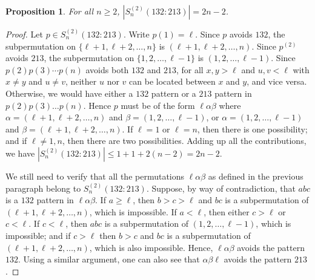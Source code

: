 \documentclass[10pt,a4paper]{amsart}
\newtheorem{proposition}[theorem]{Proposition}
\numberwithin{equation}{section}
\begin{document}
\begin{proposition}
    For all $n\geq2$, $|S_n^{(2)}(132:213)|=2n-2$.
\end{proposition}
\begin{proof}
    Let $p\in S_n^{(2)}(132:213)$. Write $p(1)=\ell$. 
Since $p$ avoids $132$, the subpermutation on $\{\ell+1,\ell+2,\ldots,n\}$ is $(\ell+1,\ell+2,\ldots,n)$. 
Since $p^{(2)}$ avoids $213$, the subpermutation on $\{1,2,\ldots,\ell-1\}$ is $(1,2,\ldots,\ell-1)$. Since $p(2)p(3)\cdots p(n)$ avoids both $132$ and $213$, for all $x,y>\ell$ and $u,v<\ell$ with $x\neq y$ and $u\neq v$, neither $u$ nor $v$ can be located between $x$ and $y$, and vice versa. Otherwise, we would have either a $132$ pattern or a $213$ pattern in $p(2)p(3)\ldots p(n)$. Hence $p$ must be of the form $\ell\alpha\beta$ where $\alpha=(\ell+1,\ell+2,\ldots,n)$ and $\beta=(1,2,\ldots,\ell-1)$, or $\alpha=(1,2,\ldots,\ell-1)$ and $\beta=(\ell+1,\ell+2,\ldots,n)$. If $\ell=1$ or $\ell=n$, then there is one possibility; and if $\ell\neq 1,n$, then there are two possibilities. Adding up all the contributions, we have $|S_n^{(2)}(132:213)|\leq 1+1+2(n-2)=2n-2$.

    We still need to verify that all the permutations $\ell\alpha\beta$ as defined in the previous paragraph belong to $S_n^{(2)}(132:213)$. 
Suppose, by way of contradiction, that $abc$ is a $132$ pattern in $\ell\alpha\beta$. If $a\geq\ell$, then $b>c>\ell$ and $bc$ is a subpermutation of $(\ell+1,\ell+2,\ldots,n)$, which is impossible. If $a<\ell$, then either $c>\ell$ or $c<\ell$. If $c<\ell$, then $abc$ is a subpermutation of $(1,2,\ldots,\ell-1)$, which is impossible; and if $c>\ell$ then $b>c$ and $bc$ is a subpermutation of $(\ell+1,\ell+2,\ldots,n)$, which is also impossible. Hence, $\ell\alpha\beta$ avoids the pattern $132$. 
Using a similar argument, one can also see that $\alpha\beta\ell$ avoids the pattern $213$.
\end{proof}
\end{document}

